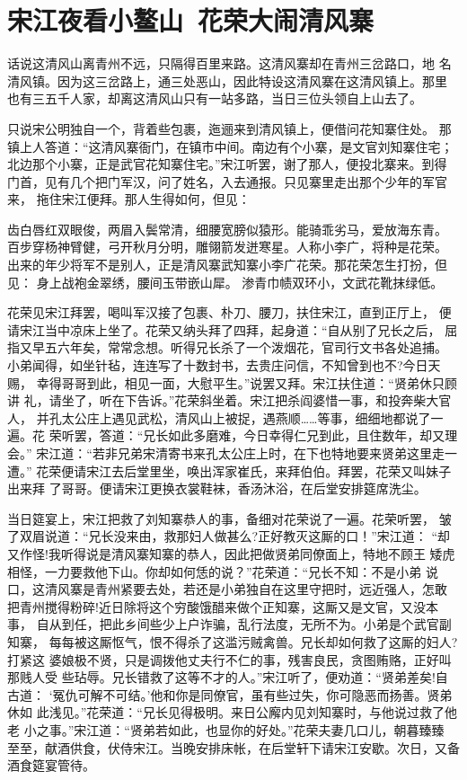 \chapter{宋江夜看小鳌山~花荣大闹清风寨}

话说这清风山离青州不远，只隔得百里来路。这清风寨却在青州三岔路口，地
名清风镇。因为这三岔路上，通三处恶山，因此特设这清风寨在这清风镇上。那里
也有三五千人家，却离这清风山只有一站多路，当日三位头领自上山去了。

只说宋公明独自一个，背着些包裹，迤逦来到清风镇上，便借问花知寨住处。
那镇上人答道：“这清风寨衙门，在镇市中间。南边有个小寨，是文官刘知寨住宅；
北边那个小寨，正是武官花知寨住宅。”宋江听罢，谢了那人，便投北寨来。到得
门首，见有几个把门军汉，问了姓名，入去通报。只见寨里走出那个少年的军官来，
拖住宋江便拜。那人生得如何，但见：

齿白唇红双眼俊，两眉入鬓常清，细腰宽膀似猿形。能骑乖劣马，爱放海东青。
百步穿杨神臂健，弓开秋月分明，雕翎箭发迸寒星。人称小李广，将种是花荣。
出来的年少将军不是别人，正是清风寨武知寨小李广花荣。那花荣怎生打扮，但见：
身上战袍金翠绣，腰间玉带嵌山犀。
渗青巾帻双环小，文武花靴抹绿低。

花荣见宋江拜罢，喝叫军汉接了包裹、朴刀、腰刀，扶住宋江，直到正厅上，
便请宋江当中凉床上坐了。花荣又纳头拜了四拜，起身道：“自从别了兄长之后，
屈指又早五六年矣，常常念想。听得兄长杀了一个泼烟花，官司行文书各处追捕。
小弟闻得，如坐针毡，连连写了十数封书，去贵庄问信，不知曾到也不?今日天赐，
幸得哥哥到此，相见一面，大慰平生。”说罢又拜。宋江扶住道：“贤弟休只顾讲
礼，请坐了，听在下告诉。”花荣斜坐着。宋江把杀阎婆惜一事，和投奔柴大官人，
并孔太公庄上遇见武松，清风山上被捉，遇燕顺……等事，细细地都说了一遍。花
荣听罢，答道：“兄长如此多磨难，今日幸得仁兄到此，且住数年，却又理会。”
宋江道：“若非兄弟宋清寄书来孔太公庄上时，在下也特地要来贤弟这里走一遭。”
花荣便请宋江去后堂里坐，唤出浑家崔氏，来拜伯伯。拜罢，花荣又叫妹子出来拜
了哥哥。便请宋江更换衣裳鞋袜，香汤沐浴，在后堂安排筵席洗尘。

当日筵宴上，宋江把救了刘知寨恭人的事，备细对花荣说了一遍。花荣听罢，
皱了双眉说道：“兄长没来由，救那妇人做甚么?正好教灭这厮的口！”宋江道：
“却又作怪!我听得说是清风寨知寨的恭人，因此把做贤弟同僚面上，特地不顾王
矮虎相怪，一力要救他下山。你却如何恁的说？”花荣道：“兄长不知：不是小弟
说口，这清风寨是青州紧要去处，若还是小弟独自在这里守把时，远近强人，怎敢
把青州搅得粉碎!近日除将这个穷酸饿醋来做个正知寨，这厮又是文官，又没本事，
自从到任，把此乡间些少上户诈骗，乱行法度，无所不为。小弟是个武官副知寨，
每每被这厮怄气，恨不得杀了这滥污贼禽兽。兄长却如何救了这厮的妇人?打紧这
婆娘极不贤，只是调拨他丈夫行不仁的事，残害良民，贪图贿赂，正好叫那贱人受
些玷辱。兄长错救了这等不才的人。”宋江听了，便劝道：“贤弟差矣!自古道：
‘冤仇可解不可结。’他和你是同僚官，虽有些过失，你可隐恶而扬善。贤弟休如
此浅见。”花荣道：“兄长见得极明。来日公廨内见刘知寨时，与他说过救了他老
小之事。”宋江道：“贤弟若如此，也显你的好处。”花荣夫妻几口儿，朝暮臻臻
至至，献酒供食，伏侍宋江。当晚安排床帐，在后堂轩下请宋江安歇。次日，又备
酒食筵宴管待。


